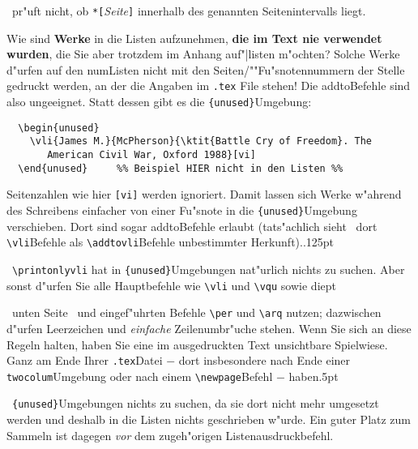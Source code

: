 \documentclass[12pt,a4paper]{article}
\newcommand{\pdfko}[1]{\kern #1pt
                          \strut\ignorespaces}%
\begin{document}
\vspace{-.2ex}\noindent
\BibArts\ pr"uft nicht, ob \verb|*[|\textit{Seite}\verb|]| innerhalb des 
genannten Seitenintervalls liegt.

\newpage\noindent
Wie sind \textbf{Werke} in die Listen aufzunehmen, \textbf{die im Text nie 
verwendet wurden}, die Sie aber trotzdem im Anhang auf"|listen m"ochten? 
Solche Werke d"urfen auf den num\hy Listen nicht mit den Seiten\fhy/""Fu"snotennummern 
der Stelle gedruckt werden, an der die Angaben im \hspace{-.15em}\verb|.tex|\hy 
File stehen! Die addto\hy Befehle sind also ungeeignet. Statt dessen gibt es die 
\verb|{unused}|\hy Umgebung:

\vspace{-.25ex}
{\small\begin{verbatim}
  \begin{unused}
    \vli{James M.}{McPherson}{\ktit{Battle Cry of Freedom}. The 
       American Civil War, Oxford 1988}[vi] 
  \end{unused}     %% Beispiel HIER nicht in den Listen %%
\end{verbatim}}

\vspace{-.25ex}
\noindent Seitenzahlen wie hier \verb|[vi]| 
werden ignoriert. Damit lassen sich Werke w"ahrend des Schreibens 
einfacher von einer Fu"snote in die \verb|{unused}|\hy Umgebung 
verschieben. Dort sind sogar addto\hy Befehle 
erlaubt (tats"achlich sieht \BibArts\ dort \verb|\vli|\hy Befehle als
\verb|\addtovli|\hy Befehle unbestimmter Herkunft).\pdfko{.125}\ 
\verb|\printonlyvli| hat in \verb|{unused}|\hy Umgebungen nat"urlich nichts 
zu suchen. Aber sonst d"urfen Sie alle \BibArts\hy Hauptbefehle 
wie \verb|\vli| und \verb|\vqu| sowie die\pdfko{1}\ 
unten Seite~\pageref{per}
und \pageref{archivquellen} eingef"uhrten Befehle \verb|\per| und \verb|\arq| 
nutzen; dazwischen d"urfen Leerzeichen und \textit{einfache} Zeilenumbr"uche
stehen. Wenn Sie sich an diese Regeln halten, haben Sie eine im ausgedruckten 
Text unsichtbare Spielwiese. Ganz am Ende Ihrer\hspace{-.2em} \verb|.tex|\hy Datei 
$-$ dort insbesondere nach Ende einer \verb|twocolum|\fhy Umgebung oder nach 
einem \verb|\newpage|\hy Befehl $-$ haben\pdfko{.5}\ 
\verb|{unused}|\hy Umgebungen 
nichts zu suchen, da sie dort nicht mehr umgesetzt werden und deshalb in 
die Listen nichts geschrieben w"urde. Ein guter Platz zum Sammeln ist 
dagegen \textit{vor} dem zugeh"origen Listenausdruckbefehl.
\end{document}
